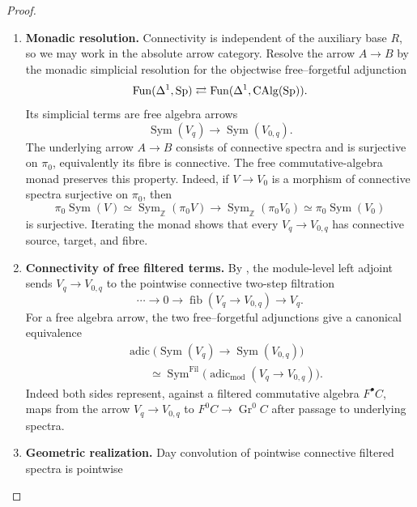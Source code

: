 \begin{proof}
\leavevmode
\begin{enumerate}[label=\textup{(\arabic*)}]
    \item \textbf{Monadic resolution.}
    Connectivity is independent of the auxiliary base \(R\), so we may work in
    the absolute arrow category. Resolve the arrow \(A\to B\) by the
    monadic simplicial resolution for the objectwise free--forgetful adjunction
    \[
        \operatorname{Fun}(\Delta^1,\operatorname{Sp})
        \rightleftarrows
        \operatorname{Fun}(\Delta^1,\operatorname{CAlg}(\operatorname{Sp})).
    \]
    Its simplicial terms are free algebra arrows
    \[
        \operatorname{Sym}(V_q)
        \longrightarrow
        \operatorname{Sym}(V_{0,q}).
    \]
    The underlying arrow \(A\to B\) consists of connective spectra and is
    surjective on \(\pi_0\), equivalently its fibre is connective. The free
    commutative-algebra monad preserves this property. Indeed, if
    \(V\to V_0\) is a morphism of connective spectra surjective on \(\pi_0\),
    then
    \[
        \pi_0\operatorname{Sym}(V)
        \simeq
        \operatorname{Sym}_{\mathbb Z}(\pi_0V)
        \longrightarrow
        \operatorname{Sym}_{\mathbb Z}(\pi_0V_0)
        \simeq
        \pi_0\operatorname{Sym}(V_0)
    \]
    is surjective. Iterating the monad shows that every
    \(V_q\to V_{0,q}\) has connective source, target, and fibre.
    \item \textbf{Connectivity of free filtered terms.}
    By , the module-level left
    adjoint sends \(V_q\to V_{0,q}\) to the pointwise connective two-step
    filtration
    \[
        \cdots\longrightarrow0\longrightarrow
        \operatorname{fib}(V_q\to V_{0,q})
        \longrightarrow V_q.
    \]
    For a free algebra arrow, the two free--forgetful adjunctions give a canonical
    equivalence
    \[
    \begin{aligned}
        &\operatorname{adic}
        \bigl(\operatorname{Sym}(V_q)\to\operatorname{Sym}(V_{0,q})\bigr)
        \\
        &\qquad\simeq
        \operatorname{Sym}^{\operatorname{Fil}}
        \bigl(\operatorname{adic}_{\mathrm{mod}}(V_q\to V_{0,q})\bigr).
    \end{aligned}
    \]
    Indeed both sides represent, against a filtered commutative algebra
    \(F^\bullet C\), maps from the arrow \(V_q\to V_{0,q}\) to
    \(F^0C\to\operatorname{Gr}^0C\) after passage to underlying spectra.
    \item \textbf{Geometric realization.}
    Day convolution of pointwise connective filtered spectra is pointwise

\end{enumerate}
\end{proof}
